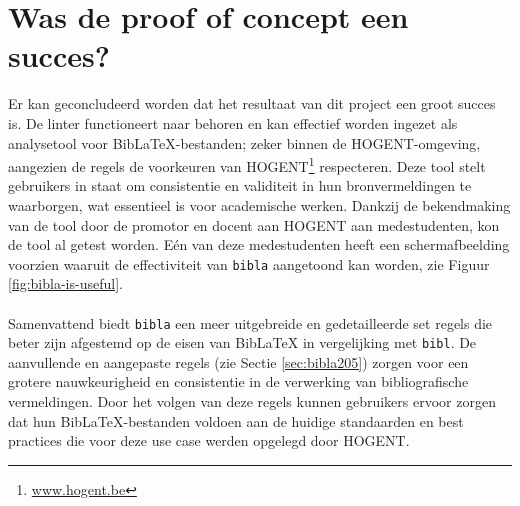 
\section{Was de proof of concept een succes?}

Er kan geconcludeerd worden dat het resultaat van dit project een groot succes is. De linter functioneert naar behoren en kan effectief worden ingezet als analysetool voor BibLaTeX-bestanden; zeker binnen de HOGENT-omgeving, aangezien de regels de voorkeuren van HOGENT\footnote{\url{www.hogent.be}} respecteren. Deze tool stelt gebruikers in staat om consistentie en validiteit in hun bronvermeldingen te waarborgen, wat essentieel is voor academische werken. Dankzij de bekendmaking van de tool door de promotor en docent aan HOGENT aan medestudenten, kon de tool al getest worden. Eén van deze medestudenten heeft een schermafbeelding voorzien waaruit de effectiviteit van \texttt{bibla} aangetoond kan worden, zie Figuur \ref{fig:bibla-is-useful}.
\\
\\
Samenvattend biedt \texttt{bibla} een meer uitgebreide en gedetailleerde set regels die beter zijn afgestemd op de eisen van BibLaTeX in vergelijking met \texttt{bibl}. De aanvullende en aangepaste regels (zie Sectie \ref{sec:bibla205}) zorgen voor een grotere nauwkeurigheid en consistentie in de verwerking van bibliografische vermeldingen. Door het volgen van deze regels kunnen gebruikers ervoor zorgen dat hun BibLaTeX-bestanden voldoen aan de huidige standaarden en best practices die voor deze use case werden opgelegd door HOGENT.

